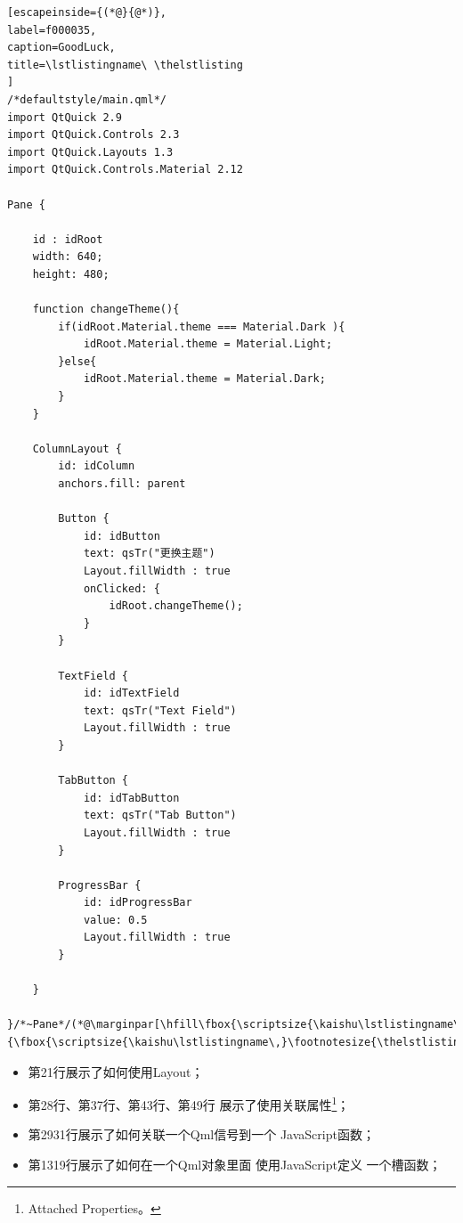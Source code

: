 \FloatBarrier
\begin{lstlisting}[escapeinside={(*@}{@*)},
label=f000035,
caption=GoodLuck,
title=\lstlistingname\ \thelstlisting
]
/*defaultstyle/main.qml*/
import QtQuick 2.9
import QtQuick.Controls 2.3
import QtQuick.Layouts 1.3
import QtQuick.Controls.Material 2.12

Pane {

    id : idRoot
    width: 640;
    height: 480;

    function changeTheme(){
        if(idRoot.Material.theme === Material.Dark ){
            idRoot.Material.theme = Material.Light;
        }else{
            idRoot.Material.theme = Material.Dark;
        }
    }

    ColumnLayout {
        id: idColumn
        anchors.fill: parent

        Button {
            id: idButton
            text: qsTr("更换主题")
            Layout.fillWidth : true
            onClicked: {
                idRoot.changeTheme();
            }
        }

        TextField {
            id: idTextField
            text: qsTr("Text Field")
            Layout.fillWidth : true
        }

        TabButton {
            id: idTabButton
            text: qsTr("Tab Button")
            Layout.fillWidth : true
        }

        ProgressBar {
            id: idProgressBar
            value: 0.5
            Layout.fillWidth : true
        }

    }

}/*~Pane*/(*@\marginpar[\hfill\fbox{\scriptsize{\kaishu\lstlistingname\,}\footnotesize{\thelstlisting}}]{\fbox{\scriptsize{\kaishu\lstlistingname\,}\footnotesize{\thelstlisting}}}@*)\end{lstlisting}          %

\begin{itemize}
\item 第21行展示了如何使用Layout；
\item 第28行、第37行、第43行、第49行
展示了使用关联属性\footnote{
Attached Properties。
}；
\item 第29\raisebox{0.16ex}{\sourcefonttwo\~{}}31行展示了如何关联一个Qml信号到一个
JavaScript函数；%
\item 第13\raisebox{0.16ex}{\sourcefonttwo\~{}}19行展示了如何在一个Qml对象里面
使用JavaScript定义
一个槽函数；
\end{itemize}

